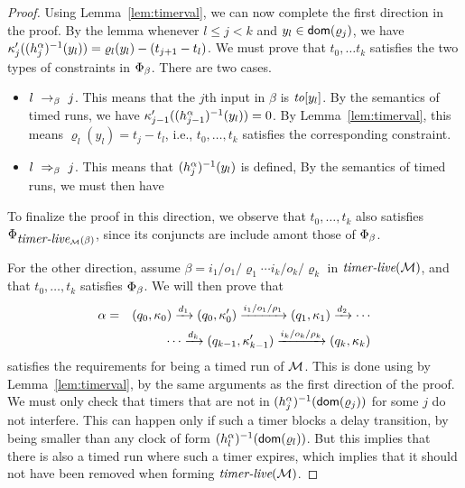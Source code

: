 \begin{proof}
Using Lemma~\ref{lem:timerval}, we can now complete the first direction in the proof.
By the lemma
whenever $l \leq j < k$ and $y_l \in {\textsf{dom}}(\varrho_{j})$, we have
$\kappa_{j}'((h_{j}^{\alpha})^{-1}(y_l)) = \varrho_l(y_l) - (t_{j+1} -t_l)$.
 We must prove that $t_0, \ldots t_k$ satisfies the two types of
 constraints in $\Phi_{\beta}$. There are two cases.
 \begin{itemize}
 \item $l \ \rightarrow_{\beta} \  j$. This means that the $j$th input in $\beta$ is
   $\mathit{to}[y_l]$. By the semantics of timed runs, we have
   $\kappa_{j-1}'((h_{j-1}^{\alpha})^{-1}(y_l)) = 0$.
   By Lemma~\ref{lem:timerval}, this means
   $\varrho_l(y_l) = t_j - t_l$, i.e.,
   $t_0, \ldots, t_k$ satisfies the corresponding constraint.
 \item $l \ \Rightarrow_{\beta}\  j$. This means that $(h_{j}^{\alpha})^{-1}(y_l)$
   is defined, 
   By the semantics of timed runs, we must then have
\end{itemize}
 To finalize the proof in this direction, we observe that  $t_0, \ldots, t_k$
 also satisfies
$\Phi_{\mbox{\it timer-live}_{{\mathcal M}}({\beta})}$, since its conjuncts
are include amont those of $\Phi_{\beta}$.

For the other direction,
assume  $\beta = {i_1/o_1/\varrho_1}  \cdots {i_k/o_k/\varrho_k}$ 
   in $\mbox{\it timer-live}({{\mathcal M}})$,
and that
$t_0, \ldots, t_k$ satisfies $\Phi_{\beta}$. 
We will then prove that
\begin{eqnarray*}
\alpha & = & (q_0,\kappa_0) \xrightarrow{d_1} (q_0,\kappa_0') \xrightarrow{i_1/o_1/\rho_1} (q_1,\kappa_1) \xrightarrow{d_2} 
\cdots
\\ && \qquad \cdots
\xrightarrow{d_k} (q_{k-1},\kappa_{k-1}') \xrightarrow{i_k/o_k/\rho_k} (q_k,\kappa_k)
\end{eqnarray*}
satisfies the requirements for being a timed run of ${\mathcal M}$. This is done
using by Lemma~\ref{lem:timerval}, by the same arguments
as the first direction of the proof. We must only check that timers that
are not in $(h_{j}^{\alpha})^{-1}({\textsf{dom}}(\varrho_j))$ for some $j$ do not
interfere. This can happen only if such a timer blocks a delay transition,
by being smaller than any clock of form
$(h_{l}^{\alpha})^{-1}({\textsf{dom}}(\varrho_l))$.
But this implies that there is also a timed run where such a timer expires,
which implies that it should not have been removed when forming
$\mbox{\it timer-live}({{\mathcal M}})$.
\end{proof}

